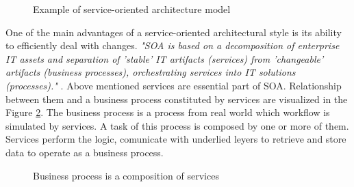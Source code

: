 \begin{figure}[htp] 
\caption{Example of service-oriented architecture model}
\label{fig:soa-architecture}
\end{figure}  

One of the main advantages of a service-oriented architectural style is its ability to efficiently deal with changes. \textit{"SOA is based on a decomposition of enterprise IT assets and separation of 'stable' IT artifacts (services) from 'changeable' artifacts (business processes), orchestrating services into IT solutions (processes)."} \cite{website:versioning-in-soa}. %
Above mentioned services are essential part of SOA. Relationship between them and a business process constituted by services are visualized in the Figure \ref{fig:business-process-services}. The business process is a process from real world which workflow is simulated by services. A task of this process is composed by one or more of them. Services perform the logic, comunicate with underlied leyers to retrieve and store data to operate as a business process.

\begin{figure}[htp] 
\caption{Business process is a composition of services}
\label{fig:business-process-services}
\end{figure} 


